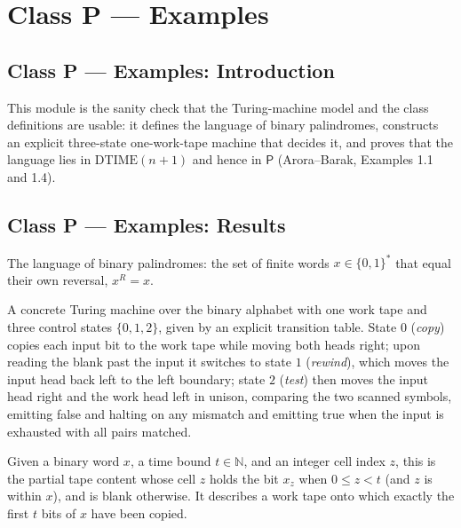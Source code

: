 \section{Class P --- Examples}
\subsection*{Class P --- Examples: Introduction}

This module is the sanity check that the Turing-machine model and the class
definitions are usable: it defines the language of binary palindromes, constructs
an explicit three-state one-work-tape machine that decides it, and proves that the
language lies in $\mathrm{DTIME}(n+1)$ and hence in $\mathsf{P}$
(Arora--Barak, Examples 1.1 and 1.4).

\subsection*{Class P --- Examples: Results}

\begin{definition}
\label{Complexity.PAL}
\leanok
The language of binary palindromes: the set of finite words
$x \in \{0,1\}^*$ that equal their own reversal, $x^{R} = x$.
\end{definition}

\begin{definition}
\label{Complexity.palTM}
\leanok
{}
A concrete Turing machine over the binary alphabet with one work tape and three
control states $\{0,1,2\}$, given by an explicit transition table. State $0$
(\emph{copy}) copies each input bit to the work tape while moving both heads
right; upon reading the blank past the input it switches to state $1$
(\emph{rewind}), which moves the input head back left to the left boundary; state
$2$ (\emph{test}) then moves the input head right and the work head left in
unison, comparing the two scanned symbols, emitting false and halting on any
mismatch and emitting true when the input is exhausted with all pairs matched.
\end{definition}

\begin{definition}
\label{Complexity.palTape}
\leanok
Given a binary word $x$, a time bound $t \in \mathbb{N}$, and an integer cell
index $z$, this is the partial tape content whose cell $z$ holds the bit $x_z$
when $0 \le z < t$ (and $z$ is within $x$), and is blank otherwise. It describes
a work tape onto which exactly the first $t$ bits of $x$ have been copied.
\end{definition}

